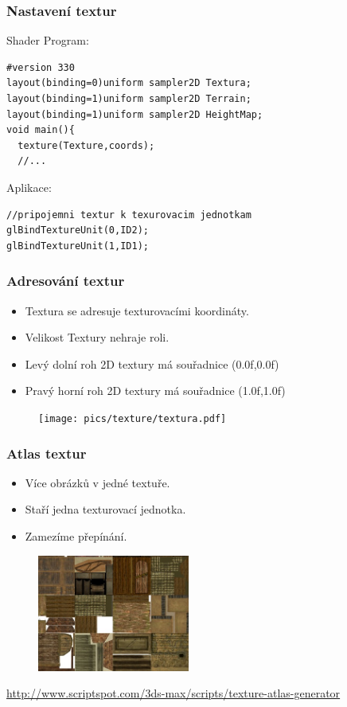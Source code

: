 \begin{frame}[fragile]
\frametitle{Nastavení textur}
Shader Program:
{\scriptsize
\begin{verbatim}
#version 330
layout(binding=0)uniform sampler2D Textura;
layout(binding=1)uniform sampler2D Terrain;
layout(binding=1)uniform sampler2D HeightMap;
void main(){
  texture(Texture,coords);
  //...
\end{verbatim}
}
Aplikace:
{\scriptsize
\begin{verbatim}
//pripojemni textur k texurovacim jednotkam
glBindTextureUnit(0,ID2);
glBindTextureUnit(1,ID1);
\end{verbatim}
}
\end{frame}

\begin{frame}[fragile]
\frametitle{Adresování textur}
	\begin{itemize}
	\item Textura se adresuje texturovacími koordináty.
	\item Velikost Textury nehraje roli.
	\item Levý dolní roh 2D textury má souřadnice (0.0f,0.0f)
	\item Pravý horní roh 2D textury má souřadnice (1.0f,1.0f)
	\end{itemize}
	\begin{figure}[h]
		\texttt{[image: pics/texture/textura.pdf]}
	\end{figure}
\end{frame}

\begin{frame}[fragile]
\frametitle{Atlas textur}
	\begin{itemize}
	\item Více obrázků v jedné textuře.
	\item Staří jedna texturovací jednotka.
	\item Zamezíme přepínání.
	\end{itemize}
	\begin{figure}[h]
		\includegraphics[width=5cm,keepaspectratio]{pics/texture/textureatlas.jpg}
	\end{figure}
	\url{http://www.scriptspot.com/3ds-max/scripts/texture-atlas-generator}
\end{frame}

